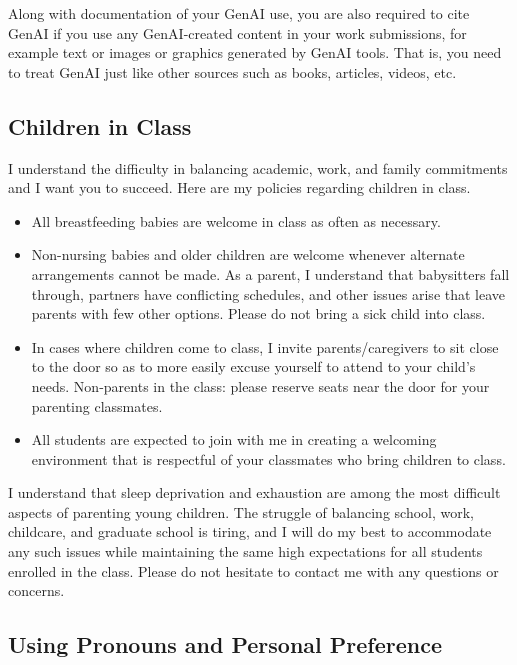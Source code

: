 \documentclass[
  letterpaper,
  DIV=11,
  numbers=noendperiod]{scrartcl}
\providecommand{\tightlist}{%
  \setlength{\itemsep}{0pt}\setlength{\parskip}{0pt}}\usepackage{longtable,booktabs,array}
\begin{document}
Along with documentation of your GenAI use, you are also required to
cite GenAI if you use any GenAI-created content in your work
submissions, for example text or images or graphics generated by GenAI
tools. That is, you need to treat GenAI just like other sources such as
books, articles, videos, etc.

\hypertarget{children-in-class}{%
\subsection{Children in Class}\label{children-in-class}}

I understand the difficulty in balancing academic, work, and family
commitments and I want you to succeed. Here are my policies regarding
children in class.

\begin{itemize}
\tightlist
\item
  All breastfeeding babies are welcome in class as often as necessary.
\item
  Non-nursing babies and older children are welcome whenever alternate
  arrangements cannot be made. As a parent, I understand that
  babysitters fall through, partners have conflicting schedules, and
  other issues arise that leave parents with few other options. Please
  do not bring a sick child into class.
\item
  In cases where children come to class, I invite parents/caregivers to
  sit close to the door so as to more easily excuse yourself to attend
  to your child's needs. Non-parents in the class: please reserve seats
  near the door for your parenting classmates.
\item
  All students are expected to join with me in creating a welcoming
  environment that is respectful of your classmates who bring children
  to class.
\end{itemize}

I understand that sleep deprivation and exhaustion are among the most
difficult aspects of parenting young children. The struggle of balancing
school, work, childcare, and graduate school is tiring, and I will do my
best to accommodate any such issues while maintaining the same high
expectations for all students enrolled in the class. Please do not
hesitate to contact me with any questions or concerns.

\hypertarget{using-pronouns-and-personal-preference}{%
\subsection{Using Pronouns and Personal
Preference}\label{using-pronouns-and-personal-preference}}
\end{document}
